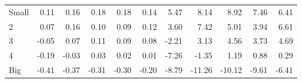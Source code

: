 \begin{table}[!ht]
\begin{tabular}{lrrrrrrrrrr}
    \\
      \cmidrule(r){2-6} \cmidrule(r){7-11}

    Small   & 0.11  & 0.16  & 0.18  & 0.18  & 0.14  & 5.47  & 8.14  & 8.92  & 7.46  & 6.41  \\
         2  & 0.07  & 0.16  & 0.10  & 0.09  & 0.12  & 3.60  & 7.42  & 5.01  & 3.94  & 6.61  \\
         3  & -0.05  & 0.07  & 0.11  & 0.09  & 0.08  & -2.21  & 3.13  & 4.56  & 3.73  & 4.69  \\
         4  & -0.19  & -0.03  & 0.03  & 0.02  & 0.01  & -7.26  & -1.35  & 1.19  & 0.88  & 0.29  \\
    Big     & -0.41  & -0.37  & -0.31  & -0.30  & -0.20  & -8.79  & -11.26  & -10.12  & -9.61  & -6.41  \\

  

  \bottomrule
\end{tabular}
\label{tbl:25_Size_Var_C1997b}
\end{table}